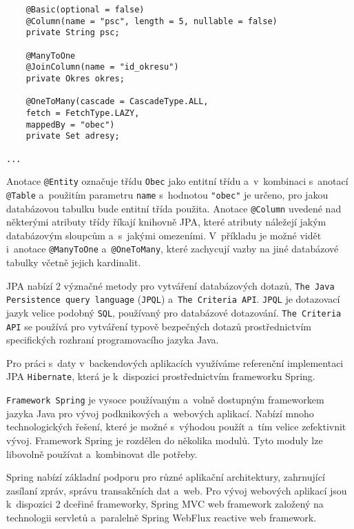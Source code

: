 \documentclass[twoside, 12pt]{article}
\begin{document}
{\begin{lstlisting}
    @Basic(optional = false)
    @Column(name = "psc", length = 5, nullable = false)
    private String psc;

    @ManyToOne
    @JoinColumn(name = "id_okresu")
    private Okres okres;

    @OneToMany(cascade = CascadeType.ALL,
    fetch = FetchType.LAZY,
    mappedBy = "obec")
    private Set adresy;

...

\end{lstlisting}

Anotace \texttt{@Entity} označuje třídu \texttt{Obec}
jako entitní třídu a~v~kombinaci s~anotací \texttt{@Table}
a~použitím parametru \texttt{name} s~hodnotou \texttt{"obec"}
je určeno, pro jakou databázovou tabulku bude entitní třída použita.
Anotace \texttt{@Column} uvedené nad některými atributy třídy
říkají knihovně JPA, které atributy náležejí jakým databázovým sloupcům a~s~jakými omezeními.
V~příkladu je možné vidět i~anotace \texttt{@ManyToOne} a~\texttt{@OneToMany},
které zachycují vazby na jiné databázové tabulky včetně jejich kardinalit.

JPA nabízí 2 význačné metody pro vytváření databázových dotazů,
\texttt{The Java Persistence query language} (\texttt{JPQL}) a~\texttt{The Criteria API}.
\texttt{JPQL} je dotazovací jazyk velice podobný \texttt{SQL}, používaný pro databázové dotazování.
\texttt{The Criteria API} se používá pro vytváření typově bezpečných dotazů
prostřednictvím specifických rozhraní programovacího jazyka Java.
\cite{oracleJPA}

Pro práci s~daty v~backendových aplikacích využíváme referenční implementaci
JPA \texttt{Hibernate}, která je k~dispozici prostřednictvím frameworku Spring.


\texttt{Framework Spring} je vysoce používaným a~volně dostupným frameworkem
jazyka Java pro vývoj podknikových a~webových aplikací.
Nabízí mnoho technologických řešení, které je možné s~výhodou
použít a~tím velice zefektivnit vývoj.
Framework Spring je rozdělen do několika modulů.
Tyto moduly lze libovolně používat a~kombinovat dle potřeby.

Spring nabízí základní podporu pro různé aplikační architektury,
zahrnující zasílaní zpráv, správu transakčních dat a~web.
Pro vývoj webových aplikací jsou k~dispozici 2 dceřiné frameworky,
Spring MVC web framework založený na technologii servletů
a~paralelně Spring WebFlux reactive web framework.

}
\end{document}
